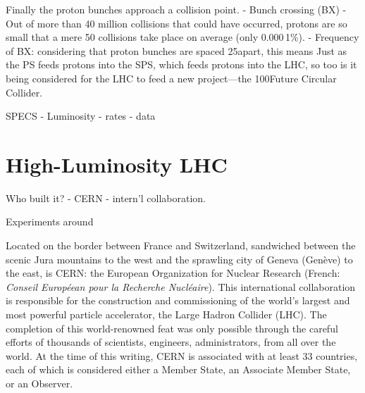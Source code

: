 Finally the proton bunches approach a collision point.
- Bunch crossing (BX)
- Out of more than 40 million \pp collisions that could have occurred, protons are so small that a mere 50 collisions take place on average (\ie only 0.000\,1\%).
- Frequency of BX: considering that proton bunches are spaced 25\ns apart, this means 
Just as the PS feeds protons into the SPS, which feeds protons into the LHC, so too is it being considered for the LHC to feed a new project---the 100\Km Future Circular Collider.


SPECS
- Luminosity
- rates
- data

\section{High-Luminosity LHC}

Who built it?
- CERN
- intern'l collaboration.

Experiments around 







Located on the border between France and Switzerland, sandwiched between the scenic Jura mountains to the west and the sprawling city of Geneva (Genève) to the east, is CERN:
the European Organization for Nuclear Research (French: \emph{Conseil Européean pour la Recherche Nucléaire}).
This international collaboration is responsible for the construction and commissioning of the world's largest and most powerful particle accelerator, the Large Hadron Collider (LHC).
The completion of this world-renowned feat was only possible through the careful efforts of thousands of scientists, engineers, administrators, \etc from all over the world.
At the time of this writing, CERN is associated with at least 33 countries, each of which is considered either a Member State, an Associate Member State, or an Observer.

